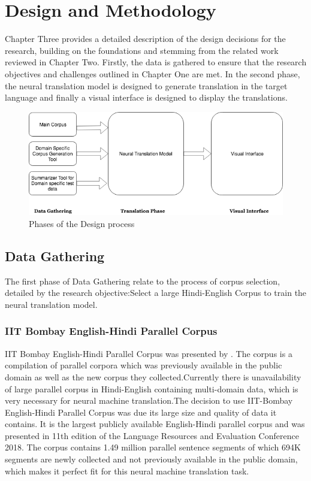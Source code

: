 \chapter{Design and Methodology}
Chapter Three provides a detailed description of the design decisions for the research, building on the foundations and stemming from the related work reviewed in Chapter Two. Firstly, the data is gathered to ensure that the research objectives and challenges outlined in Chapter One are met. In the second phase, the neural translation model is designed to generate translation in the target language and finally a visual interface is designed to display the translations.

\begin{figure}[h]
\includegraphics[width=\textwidth]{figures/maindesign.png}
\caption{Phases of the Design process} \label{maindesign}
\end{figure}

\section{Data Gathering}
The first phase of Data Gathering relate to the process of corpus selection, detailed by the research objective:Select a large Hindi-English Corpus to train the neural translation model.
\subsection{IIT Bombay English-Hindi Parallel Corpus}
IIT Bombay English-Hindi Parallel Corpus was presented by \cite{Kunchukuttan2018TheIB}. The corpus is a compilation of parallel corpora which was previously available in the public domain as well as the new corpus they collected.Currently there is unavailability of large parallel corpus in Hindi-English containing multi-domain data, which is very necessary for neural machine translation.The decision to use IIT-Bombay English-Hindi Parallel Corpus was due its large size and quality of data it contains. It is the largest publicly available English-Hindi parallel corpus and was presented in 11th edition of the Language Resources and Evaluation Conference 2018. The corpus contains 1.49 million parallel sentence segments of which 694K segments are newly collected and not previously available in the public domain, which makes it perfect fit for this neural machine translation task. 


